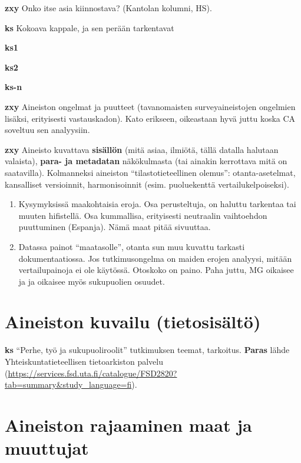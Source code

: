 \documentclass[
  finnish,
]{book}
\begin{document}
\textbf{zxy} Onko itse asia kiinnostava? (Kantolan kolumni, HS).

\textbf{ks} Kokoava kappale, ja sen perään tarkentavat

\textbf{ks1}

\textbf{ks2}

\textbf{ks-n}

\textbf{zxy} Aineiston ongelmat ja puutteet (tavanomaisten surveyaineistojen ongelmien lisäksi, erityisesti vastauskadon). Kato erikseen, oikeastaan hyvä juttu koska CA soveltuu sen analyysiin.

\textbf{zxy} Aineisto kuvattava \textbf{sisällön} (mitä asiaa, ilmiötä, tällä datalla halutaan valaista), \textbf{para- ja metadatan} näkökulmasta (tai ainakin kerrottava mitä on saatavilla). Kolmanneksi aineiston ``tilastotieteellinen olemus'': otanta-asetelmat, kansalliset versioinnit, harmonisoinnit (esim. puoluekenttä vertailukelpoiseksi).

\begin{enumerate}
\def\labelenumi{\arabic{enumi}.}
\item
  Kysymyksissä maakohtaisia eroja. Osa perusteltuja, on haluttu tarkentaa tai muuten hifistellä. Osa kummallisa, erityisesti neutraalin vaihtoehdon puuttuminen (Espanja). Nämä maat pitää sivuuttaa.
\item
  Datassa painot ``maatasolle'', otanta sun muu kuvattu tarkasti dokumentaatiossa. Jos tutkimusongelma on maiden erojen analyysi, mitään vertailupainoja ei ole käytössä. Otoskoko on paino. Paha juttu, MG oikaisee ja ja oikaisee myös sukupuolien osuudet.
\end{enumerate}

\hypertarget{aineiston-kuvailu-tietosisuxe4ltuxf6}{%
\section{Aineiston kuvailu (tietosisältö)}\label{aineiston-kuvailu-tietosisuxe4ltuxf6}}

\textbf{ks} ``Perhe, työ ja sukupuoliroolit'' tutkimuksen teemat, tarkoitus. \textbf{Paras}
lähde Yhteiskuntatieteellisen tietoarkiston palvelu (\url{https://services.fsd.uta.fi/catalogue/FSD2820?tab=summary\&study_language=fi}).

\hypertarget{aineiston-rajaaminen-maat-ja-muuttujat}{%
\section{Aineiston rajaaminen maat ja muuttujat}\label{aineiston-rajaaminen-maat-ja-muuttujat}}
\end{document}
